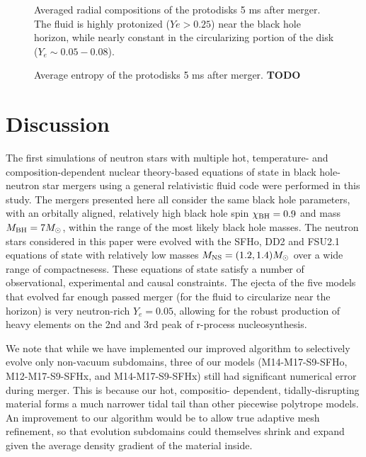 \begin{figure}
	\centering
	
	\caption[Radial compositions of the protodisks 5 ms after merger]{
	Averaged radial compositions of the protodisks 5 ms after merger.  
	The fluid is highly protonized ($Ye > 0.25$) near the black hole horizon, while nearly constant in the circularizing portion of the disk ($Y_e \sim 0.05 - 0.08$).
	}
	\label{fig:diskYes}
\end{figure}

\begin{figure}
	\centering
	
	\caption[Average entropy of the protodisks 5 ms after merger]{
		Average entropy of the protodisks 5 ms after merger. \textbf{TODO}
	}
	\label{fig:diskentropies}
\end{figure}


\section{Discussion}
\label{sec:discussion}

The first simulations of neutron stars with multiple hot, temperature- and composition-dependent nuclear theory-based equations of state in black hole-neutron star mergers using a general relativistic fluid code were performed in this study.  
The mergers presented here all consider the same black hole parameters, with an orbitally aligned, relatively high black hole spin $\chi_{\rm BH} = 0.9$ and  mass $M_{\rm BH} = 7 M_\odot$, within the range of the most likely black hole masses.  
The neutron stars considered in this paper were evolved with the SFHo, DD2 and FSU2.1 equations of state with relatively low masses $M_{\rm NS} = (1.2,1.4) M_\odot$ over a wide range of compactnesess.  
These equations of state satisfy a number of observational, experimental and causal constraints.  
The ejecta of the five models that evolved far enough passed merger (for the fluid to circularize near the horizon) is very neutron-rich $Y_e = 0.05$, allowing for the robust production of heavy elements on the 2nd and 3rd peak of r-process nucleosynthesis.

We note that while we have implemented our improved algorithm to selectively evolve only non-vacuum subdomains, three of our models (M14-M17-S9-SFHo, M12-M17-S9-SFHx, and M14-M17-S9-SFHx) still had significant numerical error during merger. 
This is because our hot, compositio- dependent, tidally-disrupting material forms a much narrower tidal tail than other piecewise polytrope models.
An improvement to our algorithm would be to allow true adaptive mesh refinement, so that evolution subdomains could themselves shrink and expand given the average density gradient of the material inside.

